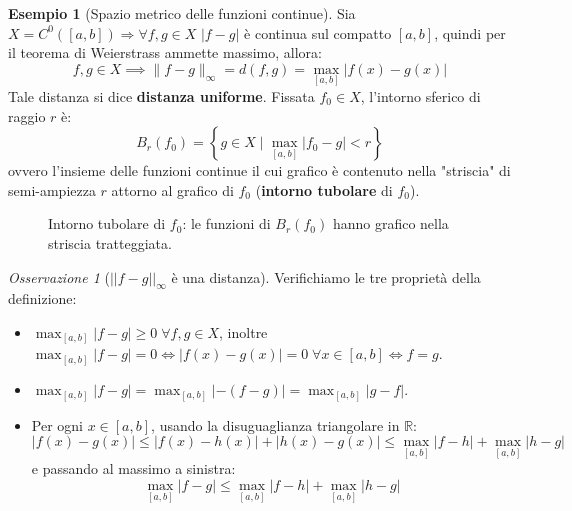 \documentclass[11pt, a4paper, openright]{book}
\theoremstyle{plain}
\theoremstyle{definition}
\newtheorem{esempio}[teorema]{Esempio}
\theoremstyle{remark}
\newtheorem{osservazione}[teorema]{Osservazione}
\begin{document}
\begin{esempio}[Spazio metrico delle funzioni continue]
    Sia $X = C^0([a, b]) \Longrightarrow \forall f, g \in X$ $|f - g|$ è continua sul compatto $[a, b]$, quindi per il teorema di Weierstrass ammette massimo, allora:
    \begin{equation}
    f, g \in X \implies \|f - g\|_\infty = d(f, g) = \max_{[a, b]} |f(x) - g(x)|
\end{equation}
    Tale distanza si dice \textbf{distanza uniforme}. Fissata $f_0 \in X$, l'intorno sferico di raggio $r$ è:
    \begin{equation}
        B_r(f_0) = \left\{g \in X \mid \max_{[a, b]} |f_0 - g| < r\right\}
    \end{equation}
    ovvero l'insieme delle funzioni continue il cui grafico è contenuto nella "striscia" di semi-ampiezza $r$ attorno al grafico di $f_0$ (\textbf{intorno tubolare} di $f_0$).
\begin{figure}[H]
    \centering
    \caption{Intorno tubolare di $f_0$: le funzioni di $B_r(f_0)$ hanno grafico nella striscia tratteggiata.}
\end{figure}
\end{esempio}

\begin{osservazione}[$||f - g||_\infty$ è una distanza]
    Verifichiamo le tre proprietà della definizione:
    \begin{itemize}
        \item $\max_{[a, b]} |f - g| \geq 0 \; \forall f, g \in X$, inoltre $\max_{[a, b]} |f - g| = 0 \iff |f(x) - g(x)| = 0 \; \forall x \in [a, b] \iff f = g$.
        \item $\max_{[a, b]} |f - g| = \max_{[a, b]} |-(f - g)| = \max_{[a, b]} |g - f|$.
        \item Per ogni $x \in [a, b]$, usando la disuguaglianza triangolare in $\mathbb{R}$:
        \begin{equation}
            |f(x) - g(x)| \leq |f(x) - h(x)| + |h(x) - g(x)| \leq \max_{[a, b]} |f - h| + \max_{[a, b]} |h - g|
        \end{equation}
        e passando al massimo a sinistra:
        \begin{equation}
            \max_{[a, b]} |f - g| \leq \max_{[a, b]} |f - h| + \max_{[a, b]} |h - g|
        \end{equation}
    \end{itemize}
\end{osservazione}
\end{document}

